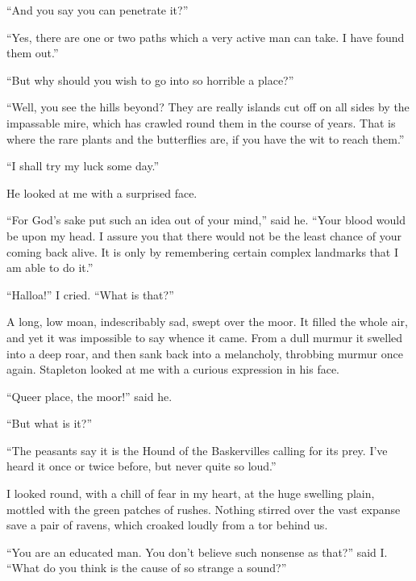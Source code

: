 \documentclass[paper=5.5in:8.5in,BCOR=7mm,twoside,DIV=calc,12pt,usegeometry,openany,chapterprefix,endperiod]{scrbook} %
\begin{document}
\enquote{And you say you can penetrate it?}

\enquote{Yes, there are one or two paths which a very active man can take. I have found them out.}


\afterpage{\clearpage}

\enquote{But why should you wish to go into so horrible a place?}

\enquote{Well, you see the hills beyond? They are really islands cut off on all sides by the impassable mire, which has crawled round them in the course of years. That is where the rare plants and the butterflies are, if you have the wit to reach them.}

\enquote{I shall try my luck some day.}

He looked at me with a surprised face.

\enquote{For God's sake put such an idea out of your mind,} said he. \enquote{Your blood would be upon my head. I assure you that there would not be the least chance of your coming back alive. It is only by remembering certain complex landmarks that I am able to do it.}

\enquote{Halloa!} I cried. \enquote{What is that?}

A long, low moan, indescribably sad, swept over the moor. It filled the whole air, and yet it was impossible to say whence it came. From a dull murmur it swelled into a deep roar, and then sank back into a melancholy, throbbing murmur once again. Stapleton looked at me with a curious expression in his face.

\enquote{Queer place, the moor!} said he.

\enquote{But what is it?}

\enquote{The peasants say it is the Hound of the Baskervilles calling for its prey. I've heard it once or twice before, but never quite so loud.}

I looked round, with a chill of fear in my heart, at the huge swelling plain, mottled with the green patches of rushes. Nothing stirred over the vast expanse save a pair of ravens, which croaked loudly from a tor behind us.

\enquote{You are an educated man. You don't believe such nonsense as that?} said I. \enquote{What do you think is the cause of so strange a sound?}
\end{document}
